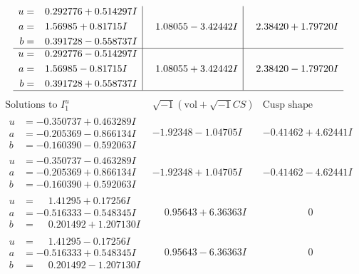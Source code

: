 \documentclass[1p]{elsarticle_modified}
\theoremstyle{definition}
\newcommand{\I}{\sqrt{-1}}
\begin{document}
$$\begin{array}{c|c|c}
\begin{aligned}
u &= \phantom{-}0.292776 + 0.514297 I \\
a &= \phantom{-}1.56985 + 0.81715 I \\
b &= \phantom{-}0.391728 - 0.558737 I\end{aligned}
 & \phantom{-}1.08055 - 3.42442 I & \phantom{-}2.38420 + 1.79720 I \\ \hline\begin{aligned}
u &= \phantom{-}0.292776 - 0.514297 I \\
a &= \phantom{-}1.56985 - 0.81715 I \\
b &= \phantom{-}0.391728 + 0.558737 I\end{aligned}
 & \phantom{-}1.08055 + 3.42442 I & \phantom{-}2.38420 - 1.79720 I\\
 \hline 
 \end{array}$$\newpage$$\begin{array}{c|c|c}  
\text{Solutions to }I^u_{1}& \I (\text{vol} + \sqrt{-1}CS) & \text{Cusp shape}\\
 \hline 
\begin{aligned}
u &= -0.350737 + 0.463289 I \\
a &= -0.205369 - 0.866134 I \\
b &= -0.160390 - 0.592063 I\end{aligned}
 & -1.92348 - 1.04705 I & -0.41462 + 4.62441 I \\ \hline\begin{aligned}
u &= -0.350737 - 0.463289 I \\
a &= -0.205369 + 0.866134 I \\
b &= -0.160390 + 0.592063 I\end{aligned}
 & -1.92348 + 1.04705 I & -0.41462 - 4.62441 I \\ \hline\begin{aligned}
u &= \phantom{-}1.41295 + 0.17256 I \\
a &= -0.516333 - 0.548345 I \\
b &= \phantom{-}0.201492 + 1.207130 I\end{aligned}
 & \phantom{-}0.95643 + 6.36363 I & \phantom{-0.000000 } 0 \\ \hline\begin{aligned}
u &= \phantom{-}1.41295 - 0.17256 I \\
a &= -0.516333 + 0.548345 I \\
b &= \phantom{-}0.201492 - 1.207130 I\end{aligned}
 & \phantom{-}0.95643 - 6.36363 I & \phantom{-0.000000 } 0 \\ \hline\begin{aligned}

\end{aligned}
\end{array}$$
\end{document}
